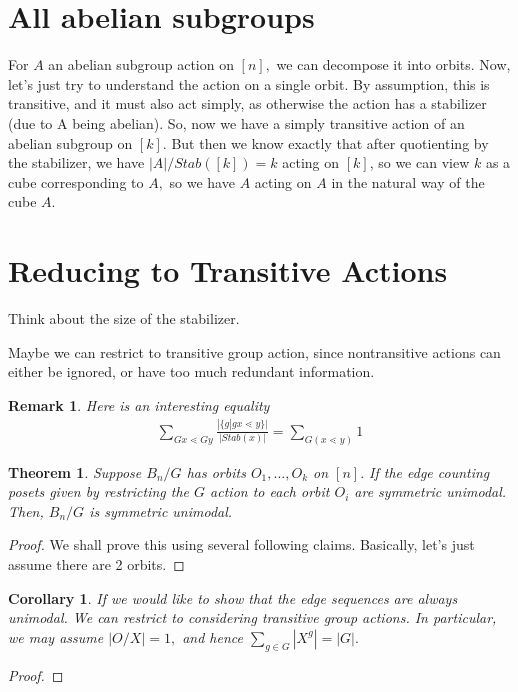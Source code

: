 \documentclass{amsart}
\newtheorem{cor}[subsubsection]{Corollary}
\newtheorem{thm}[subsubsection]{Theorem}
\newtheorem{rem}[subsubsection]{Remark}
\begin{document}
\section{All abelian subgroups}

For $A$ an abelian subgroup action on $[n],$ we can decompose it into orbits. Now, let's just try to understand the action on a single orbit. By assumption, this is transitive, and it must also act simply, as otherwise the action has a stabilizer (due to A being abelian). So, now we have a simply transitive action of an abelian subgroup on $[k].$ But then we know exactly that after quotienting by the stabilizer, we have $|A|/Stab([k])=k$ acting on $[k]$, so we can view $k$ as a cube corresponding to $A,$ so we have $A$ acting on $A$ in the natural way of the cube $A.$

\section{Reducing to Transitive Actions}

Think about the size of the stabilizer.

Maybe we can restrict to transitive group action, since nontransitive actions can either be ignored, or have too much redundant information.

\begin{rem}
Here is an interesting equality
\begin{align*}
	\sum_{Gx \lessdot Gy}^{}\frac{|\{g|gx \lessdot y\}|}{|Stab(x)|}=\sum_{G(x\lessdot y)}^{}1
\end{align*}
\end{rem}

\begin{thm}
Suppose $B_n/G$ has orbits $O_1,\ldots, O_k$ on $[n].$ If the edge counting posets given by restricting the $G$ action to each orbit $O_i$ are symmetric unimodal. Then, $B_n/G$ is symmetric unimodal.
\end{thm}
\begin{proof}
We shall prove this using several following claims. Basically, let's just assume there are 2 orbits.
\end{proof}

\begin{cor}
If we would like to show that the edge sequences are always unimodal. We can restrict to considering transitive group actions. In particular, we may assume $|O/X| = 1,$ and hence $\sum_{g\in G}^{}|X^g| = |G|.$
\end{cor}
\begin{proof}

\end{proof}
\end{document}
